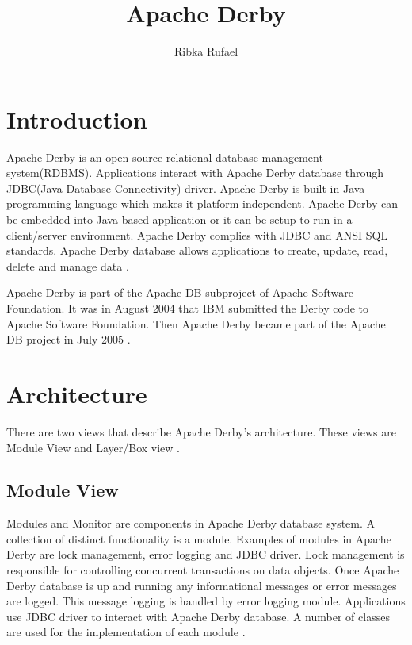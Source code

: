 \documentclass[9pt,twocolumn,twoside]{../../styles/osajnl}
\title{Apache Derby}
\author[1,*, +]{Ribka Rufael}
\affil[1]{School of Informatics and Computing, Bloomington, IN 47408, U.S.A.}
\affil[*]{Corresponding authors: rrufael@umail.iu.edu}
\affil[+]{HID: S17-IO-3016}
\begin{document}
\maketitle

\section{Introduction}

Apache Derby is an open source relational database management
system(RDBMS). Applications interact with Apache Derby database
through JDBC(Java Database Connectivity) driver. Apache Derby is built
in Java programming language which makes it platform
independent. Apache Derby can be embedded into Java based application
or it can be setup to run in a client/server environment. Apache Derby
complies with JDBC and ANSI SQL standards. Apache Derby database
allows applications to create, update, read, delete and manage data
\cite{www-derbyoverview,www-apachederbycharter}.

Apache Derby is part of the Apache DB subproject of Apache Software
Foundation. It was in August 2004 that IBM submitted the Derby code to
Apache Software Foundation. Then Apache Derby became part of the
Apache DB project in July 2005 \cite{www-apachederbycharter}.

\section{Architecture}

There are two views that describe Apache Derby's architecture. These
views are Module View and Layer/Box view \cite{www-derbyarch}.

\subsection {Module View} 


Modules and Monitor are components in Apache Derby database system. A
collection of distinct functionality is a module. Examples of modules
in Apache Derby are lock management, error logging and JDBC
driver. Lock management is responsible for controlling concurrent
transactions on data objects. Once Apache Derby database is up and
running any informational messages or error messages are logged. This
message logging is handled by error logging module.  Applications use
JDBC driver to interact with Apache Derby database. A number of
classes are used for the implementation of each module
\cite{www-derbyarch}.
\end{document}
